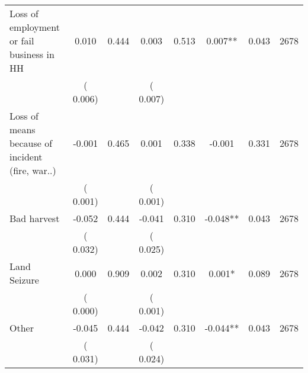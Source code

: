 \begin{tabular}{l*{7}{c}}
 Loss of employment or fail business in HH       &              0.010       &        0.444  &              0.003       &        0.513  &              0.007**       &              0.043 &  2678 \\ 
                       &       (       0.006)             &                               &       (       0.007)                     &                               &                                               &                                &                      \\ 

 Loss of means because of incident (fire, war..)       &             -0.001       &        0.465  &              0.001       &        0.338  &             -0.001       &              0.331 &  2678 \\ 
                       &       (       0.001)             &                               &       (       0.001)                     &                               &                                               &                                &                      \\ 

 Bad harvest       &             -0.052       &        0.444  &             -0.041       &        0.310  &             -0.048**       &              0.043 &  2678 \\ 
                       &       (       0.032)             &                               &       (       0.025)                     &                               &                                               &                                &                      \\ 

 Land Seizure       &              0.000       &        0.909  &              0.002       &        0.310  &              0.001*       &              0.089 &  2678 \\ 
                       &       (       0.000)             &                               &       (       0.001)                     &                               &                                               &                                &                      \\ 

 Other       &             -0.045       &        0.444  &             -0.042       &        0.310  &             -0.044**       &              0.043 &  2678 \\ 
                       &       (       0.031)             &                               &       (       0.024)                     &                               &                                               &                                &                      \\ 

\hline \end{tabular}